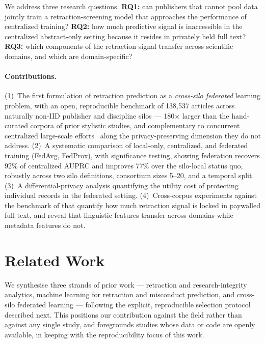 \documentclass[review,12pt]{elsarticle}
\begin{document}
We address three research questions. \textbf{RQ1:} can publishers that cannot
pool data jointly train a retraction-screening model that approaches the
performance of centralized training? \textbf{RQ2:} how much predictive signal
is inaccessible in the centralized abstract-only setting because it resides in
privately held full text? \textbf{RQ3:} which components of the retraction
signal transfer across scientific domains, and which are domain-specific?

\paragraph{Contributions.}
(1)~The first formulation of retraction prediction as a \emph{cross-silo
federated} learning problem, with an open, reproducible benchmark of
138{,}537 articles across naturally non-IID publisher and discipline silos ---
180$\times$ larger than the hand-curated corpora of prior stylistic studies,
and complementary to concurrent centralized large-scale
efforts~\cite{ref_fletcher} along the privacy-preserving dimension they do not
address.
(2)~A systematic comparison of local-only, centralized, and federated
training (FedAvg, FedProx), with significance testing, showing federation
recovers 92\% of centralized AUPRC and improves 77\% over the silo-local
status quo, robustly across two silo definitions, consortium sizes 5--20, and
a temporal split.
(3)~A differential-privacy analysis quantifying the utility cost of protecting
individual records in the federated setting.
(4)~Cross-corpus experiments against the benchmark of
\cite{ref_usman_websci25} that quantify how much retraction signal is locked
in paywalled full text, and reveal that linguistic features transfer across
domains while metadata features do not.

\section{Related Work}
\label{sec:related}
We synthesise three strands of prior work --- retraction and
research-integrity analytics, machine learning for retraction and misconduct
prediction, and cross-silo federated learning --- following the explicit,
reproducible selection protocol described next. This positions our
contribution against the field rather than against any single study, and
foregrounds studies whose data or code are openly available, in keeping with
the reproducibility focus of this work.
\end{document}
